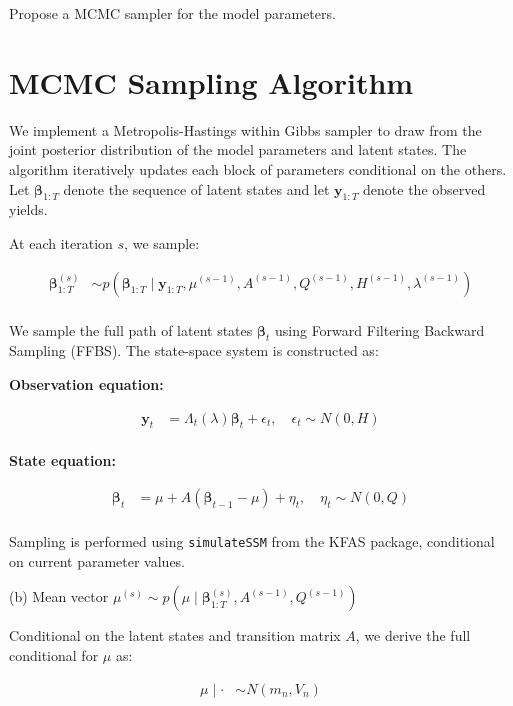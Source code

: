 Propose a MCMC sampler for the model parameters.

\section{MCMC Sampling Algorithm}

We implement a Metropolis-Hastings within Gibbs sampler to draw from the joint posterior distribution of the model parameters and latent states. The algorithm iteratively updates each block of parameters conditional on the others. Let $\mathbf{\beta}_{1:T}$ denote the sequence of latent states and let $\mathbf{y}_{1:T}$ denote the observed yields.

At each iteration $s$, we sample:

\begin{align*}
\mathbf{\beta}_{1:T}^{(s)} &\sim p(\mathbf{\beta}_{1:T} \mid \mathbf{y}_{1:T}, \mu^{(s-1)}, A^{(s-1)}, Q^{(s-1)}, H^{(s-1)}, \lambda^{(s-1)}) \\
\end{align*}

We sample the full path of latent states $\mathbf{\beta}_t$ using Forward Filtering Backward Sampling (FFBS). The state-space system is constructed as:

\textbf{Observation equation:}

\begin{align*}
\mathbf{y}_t &= \Lambda_t(\lambda) \mathbf{\beta}_t + \epsilon_t, \quad \epsilon_t \sim N(0, H) \\
\end{align*}

\textbf{State equation:}

\begin{align*}
\mathbf{\beta}_t &= \mu + A (\mathbf{\beta}_{t-1} - \mu) + \eta_t, \quad \eta_t \sim N(0, Q) \\
\end{align*}

Sampling is performed using \texttt{simulateSSM} from the KFAS package, conditional on current parameter values.

(b) Mean vector $\mu^{(s)} \sim p(\mu \mid \mathbf{\beta}_{1:T}^{(s)}, A^{(s-1)}, Q^{(s-1)})$

Conditional on the latent states and transition matrix $A$, we derive the full conditional for $\mu$ as:

\begin{align*}
\mu \mid \cdot &\sim N(m_n, V_n)
\end{align*}

